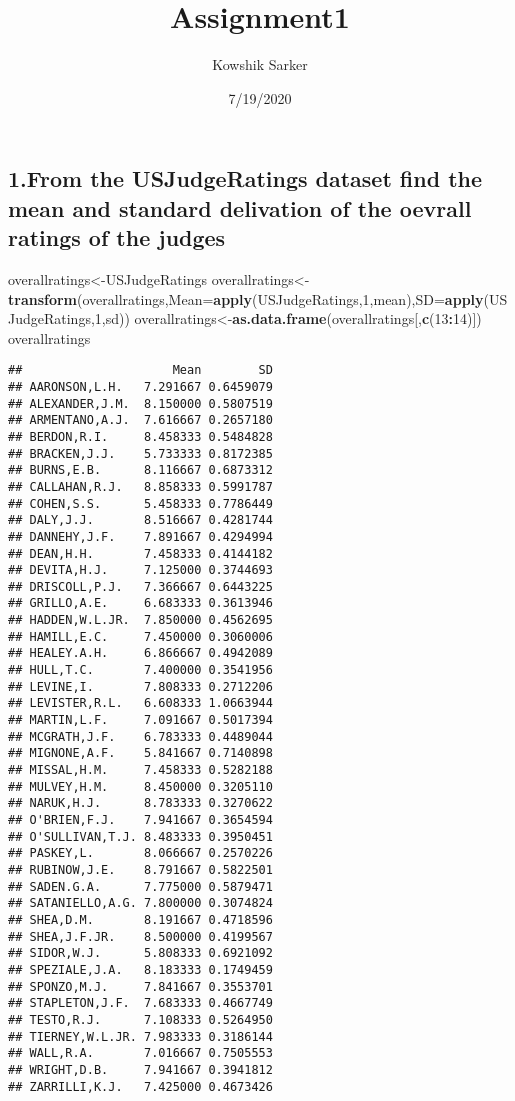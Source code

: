 \documentclass[
]{article}
\title{Assignment1}
\author{Kowshik Sarker}
\date{7/19/2020}
\newenvironment{Shaded}{\begin{snugshade}}{\end{snugshade}}
\newcommand{\DataTypeTok}[1]{\textcolor[rgb]{0.13,0.29,0.53}{#1}}
\newcommand{\DecValTok}[1]{\textcolor[rgb]{0.00,0.00,0.81}{#1}}
\newcommand{\KeywordTok}[1]{\textcolor[rgb]{0.13,0.29,0.53}{\textbf{#1}}}
\newcommand{\NormalTok}[1]{#1}
\newcommand{\OperatorTok}[1]{\textcolor[rgb]{0.81,0.36,0.00}{\textbf{#1}}}
\begin{document}
\maketitle

\hypertarget{from-the-usjudgeratings-dataset-find-the-mean-and-standard-delivation-of-the-oevrall-ratings-of-the-judges}{%
\subsection{1.From the USJudgeRatings dataset find the mean and standard
delivation of the oevrall ratings of the
judges}\label{from-the-usjudgeratings-dataset-find-the-mean-and-standard-delivation-of-the-oevrall-ratings-of-the-judges}}

\begin{Shaded}
\begin{Highlighting}[]
\NormalTok{overallratings<-USJudgeRatings}
\NormalTok{overallratings<-}\KeywordTok{transform}\NormalTok{(overallratings,}\DataTypeTok{Mean=}\KeywordTok{apply}\NormalTok{(USJudgeRatings,}\DecValTok{1}\NormalTok{,mean),}\DataTypeTok{SD=}\KeywordTok{apply}\NormalTok{(USJudgeRatings,}\DecValTok{1}\NormalTok{,sd))}
\NormalTok{overallratings<-}\KeywordTok{as.data.frame}\NormalTok{(overallratings[,}\KeywordTok{c}\NormalTok{(}\DecValTok{13}\OperatorTok{:}\DecValTok{14}\NormalTok{)])}
\NormalTok{overallratings}
\end{Highlighting}
\end{Shaded}

\begin{verbatim}
##                     Mean        SD
## AARONSON,L.H.   7.291667 0.6459079
## ALEXANDER,J.M.  8.150000 0.5807519
## ARMENTANO,A.J.  7.616667 0.2657180
## BERDON,R.I.     8.458333 0.5484828
## BRACKEN,J.J.    5.733333 0.8172385
## BURNS,E.B.      8.116667 0.6873312
## CALLAHAN,R.J.   8.858333 0.5991787
## COHEN,S.S.      5.458333 0.7786449
## DALY,J.J.       8.516667 0.4281744
## DANNEHY,J.F.    7.891667 0.4294994
## DEAN,H.H.       7.458333 0.4144182
## DEVITA,H.J.     7.125000 0.3744693
## DRISCOLL,P.J.   7.366667 0.6443225
## GRILLO,A.E.     6.683333 0.3613946
## HADDEN,W.L.JR.  7.850000 0.4562695
## HAMILL,E.C.     7.450000 0.3060006
## HEALEY.A.H.     6.866667 0.4942089
## HULL,T.C.       7.400000 0.3541956
## LEVINE,I.       7.808333 0.2712206
## LEVISTER,R.L.   6.608333 1.0663944
## MARTIN,L.F.     7.091667 0.5017394
## MCGRATH,J.F.    6.783333 0.4489044
## MIGNONE,A.F.    5.841667 0.7140898
## MISSAL,H.M.     7.458333 0.5282188
## MULVEY,H.M.     8.450000 0.3205110
## NARUK,H.J.      8.783333 0.3270622
## O'BRIEN,F.J.    7.941667 0.3654594
## O'SULLIVAN,T.J. 8.483333 0.3950451
## PASKEY,L.       8.066667 0.2570226
## RUBINOW,J.E.    8.791667 0.5822501
## SADEN.G.A.      7.775000 0.5879471
## SATANIELLO,A.G. 7.800000 0.3074824
## SHEA,D.M.       8.191667 0.4718596
## SHEA,J.F.JR.    8.500000 0.4199567
## SIDOR,W.J.      5.808333 0.6921092
## SPEZIALE,J.A.   8.183333 0.1749459
## SPONZO,M.J.     7.841667 0.3553701
## STAPLETON,J.F.  7.683333 0.4667749
## TESTO,R.J.      7.108333 0.5264950
## TIERNEY,W.L.JR. 7.983333 0.3186144
## WALL,R.A.       7.016667 0.7505553
## WRIGHT,D.B.     7.941667 0.3941812
## ZARRILLI,K.J.   7.425000 0.4673426
\end{verbatim}
\end{document}
